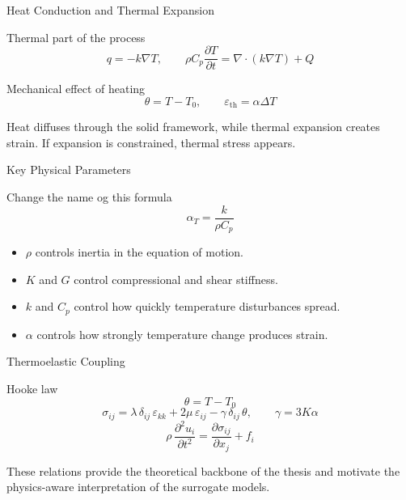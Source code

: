 \documentclass[aspectratio=169,10pt]{beamer}
\begin{document}
\begin{frame}{Heat Conduction and Thermal Expansion}
  \begin{block}{Thermal part of the process}
    \[
      q = -k\nabla T,
      \qquad
      \rho C_p\frac{\partial T}{\partial t}
      =
      \nabla\cdot(k\nabla T)+Q
    \]
  \end{block}
  \vskip 4pt
  \begin{block}{Mechanical effect of heating}
    \[
      \theta = T-T_0,
      \qquad
      \varepsilon_{\mathrm{th}}=\alpha\Delta T
    \]
  \end{block}
  \vskip 4pt
  Heat diffuses through the solid framework, while thermal expansion
  creates strain. If expansion is constrained, thermal stress appears.
\end{frame}

\begin{frame}{Key Physical Parameters}
  \begin{block}{Change the name og this formula}
    \[
      \alpha_T = \frac{k}{\rho C_p}
    \]
  \end{block}
  \vskip 6pt
  \begin{itemize}
    \item $\rho$ controls inertia in the equation of motion.
    \item $K$ and $G$ control compressional and shear stiffness.
    \item $k$ and $C_p$ control how quickly temperature disturbances spread.
    \item $\alpha$ controls how strongly temperature change produces strain.
  \end{itemize}
\end{frame}

\begin{frame}{Thermoelastic Coupling}
  \begin{block}{Hooke law}
    \[
      \theta = T - T_0
    \]
    \[
      \sigma_{ij} = \lambda\,\delta_{ij}\,\varepsilon_{kk}
      + 2\mu\,\varepsilon_{ij}
      - \gamma\,\delta_{ij}\,\theta,
      \qquad
      \gamma = 3K\alpha
    \]
    \[
      \rho\,\frac{\partial^2u_i}{\partial t^2}
      = \frac{\partial \sigma_{ij}}{\partial x_j} + f_i
    \]
  \end{block}
  \vskip 6pt
  These relations provide the theoretical backbone of the thesis and
  motivate the physics-aware interpretation of the surrogate models.
\end{frame}
\end{document}
